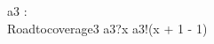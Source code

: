 
\begin{circus}
\circchannel a3 : \nat \\
\circprocess Roadtocoverage3 \circdef \circbegin
	\circspot a3?x \then a3!(x + 1 - 1) \then \Skip \\
	\circend
\end{circus}
